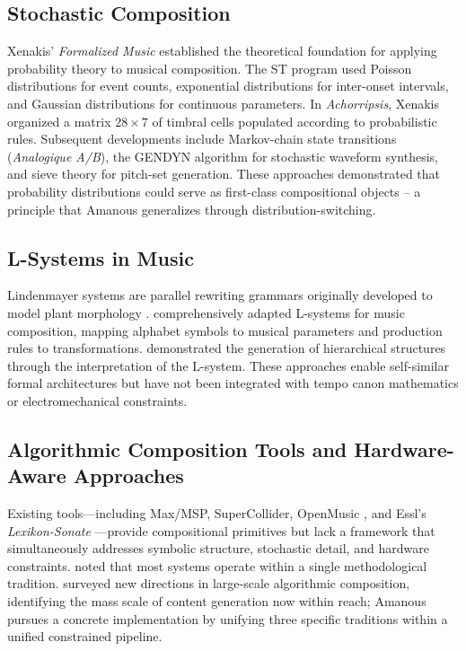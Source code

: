 \documentclass[a4paper]{article}
\theoremstyle{definition}
\theoremstyle{remark}
\begin{document}
\subsection{Stochastic Composition}

Xenakis' \emph{Formalized Music} \citep{xenakis1992formalized} established the theoretical foundation for applying probability theory to musical composition. The ST program used Poisson distributions for event counts, exponential distributions for inter-onset intervals, and Gaussian distributions for continuous parameters. In \emph{Achorripsis}, Xenakis organized a matrix $28 \times 7$ of timbral cells populated according to probabilistic rules. Subsequent developments include Markov-chain state transitions (\emph{Analogique A/B}), the GENDYN algorithm for stochastic waveform synthesis, and sieve theory for pitch-set generation. These approaches demonstrated that probability distributions could serve as first-class compositional objects -- a principle that Amanous generalizes through distribution-switching.

\subsection{L-Systems in Music}

Lindenmayer systems are parallel rewriting grammars originally developed to model plant morphology \citep{prusinkiewicz2012algorithmic}. \citet{manousakis2006musical} comprehensively adapted L-systems for music composition, mapping alphabet symbols to musical parameters and production rules to transformations. \citet{worth2005growing} demonstrated the generation of hierarchical structures through the interpretation of the L-system. These approaches enable self-similar formal architectures but have not been integrated with tempo canon mathematics or electromechanical constraints.

\subsection{Algorithmic Composition Tools and Hardware-Aware Approaches}

Existing tools---including Max/MSP, SuperCollider, OpenMusic \citep{assayag1999computer}, and Essl's \emph{Lexikon-Sonate} \citep{collins2017cambridge}---provide compositional primitives but lack a framework that simultaneously addresses symbolic structure, stochastic detail, and hardware constraints. \citet{nierhaus2009algorithmic} noted that most systems operate within a single methodological tradition. \citet{collins2018there} surveyed new directions in large-scale algorithmic composition, identifying the mass scale of content generation now within reach; Amanous pursues a concrete implementation by unifying three specific traditions within a unified constrained pipeline.
\end{document}
